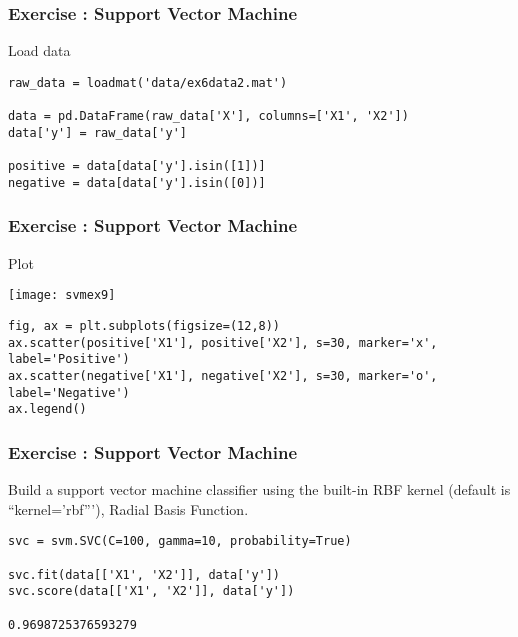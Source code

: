 \begin{frame}[fragile]\frametitle{Exercise : Support Vector Machine}
Load data
\begin{lstlisting}
raw_data = loadmat('data/ex6data2.mat')

data = pd.DataFrame(raw_data['X'], columns=['X1', 'X2'])
data['y'] = raw_data['y']

positive = data[data['y'].isin([1])]
negative = data[data['y'].isin([0])]
\end{lstlisting}
\end{frame}

\begin{frame}[fragile]\frametitle{Exercise : Support Vector Machine}
Plot

\begin{center}
\texttt{[image: svmex9]}
\end{center}


\begin{lstlisting}
fig, ax = plt.subplots(figsize=(12,8))
ax.scatter(positive['X1'], positive['X2'], s=30, marker='x', label='Positive')
ax.scatter(negative['X1'], negative['X2'], s=30, marker='o', label='Negative')
ax.legend()
\end{lstlisting}

\end{frame}

\begin{frame}[fragile]\frametitle{Exercise : Support Vector Machine}
Build a support vector machine classifier using the built-in RBF kernel (default is ``kernel='rbf'''), Radial Basis Function.
\begin{lstlisting}
svc = svm.SVC(C=100, gamma=10, probability=True)

svc.fit(data[['X1', 'X2']], data['y'])
svc.score(data[['X1', 'X2']], data['y'])

0.9698725376593279

\end{lstlisting}
\end{frame}


